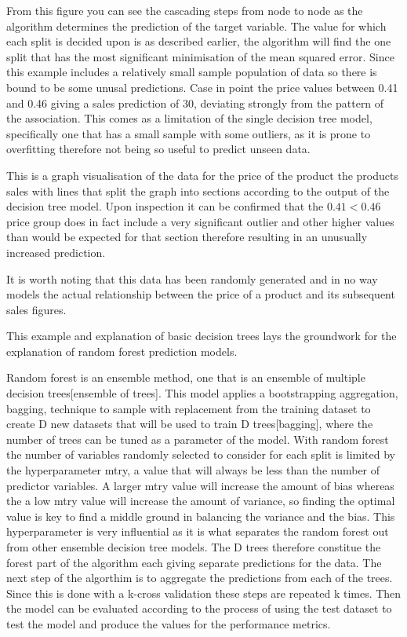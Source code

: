 \documentclass[11pt]{article}
\begin{document}
From this figure you can see the cascading steps from node to node as the algorithm determines the prediction of the target variable. The value for which each split is decided upon is as described earlier, the algorithm will find the one split that has the most significant minimisation of the mean squared error. Since this example includes a relatively small sample population of data so there is bound to be some unusal predictions. Case in point the price values between 0.41 and 0.46 giving a sales prediction of 30, deviating strongly from the pattern of the association. This comes as a limitation of the single decision tree model, specifically one that has a small sample with some outliers, as it is prone to overfitting therefore not being so useful to predict unseen data.


This is a graph visualisation of the data for the price of the product the products sales with lines that split the graph into sections according to the output of the decision tree model. Upon inspection it can be confirmed that the \(0.41 < 0.46\) price group does in fact include a very significant outlier and other higher values than would be expected for that section therefore resulting in an unusually increased prediction.

It is worth noting that this data has been randomly generated and in no way models the actual relationship between the price of a product and its subsequent sales figures.

This example and explanation of basic decision trees lays the groundwork for the explanation of random forest prediction models.

Random forest is an ensemble method, one that is an ensemble of multiple decision trees[ensemble of trees]. This model applies a bootstrapping aggregation, bagging, technique to sample with replacement from the training dataset to create D new datasets that will be used to train D trees[bagging], where the number of trees can be tuned as a parameter of the model. With random forest the number of variables randomly selected to consider for each split is limited by the hyperparameter mtry, a value that will always be less than the number of predictor variables. A larger mtry value will increase the amount of bias whereas the a low mtry value will increase the amount of variance, so finding the optimal value is key to find a middle ground in balancing the variance and the bias. This hyperparameter is very influential as it is what separates the random forest out from other ensemble decision tree models. The D trees therefore constitue the forest part of the algorithm each giving separate predictions for the data. The next step of the algorthim is to aggregate the predictions from each of the trees. Since this is done with a k-cross validation these steps are repeated k times. Then the model can be evaluated according to the process of using the test dataset to test the model and produce the values for the performance metrics. 
\end{document}
